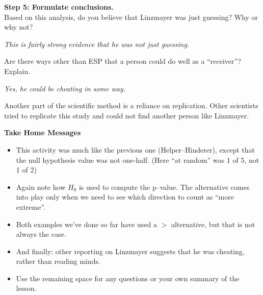 

{\bf Step 5: Formulate conclusions.}\\
 Based on this analysis, do you believe  that Linzmayer was just
 guessing? Why or why not? 

\begin{students}
  \vspace{1.5cm}
\end{students}
\begin{key}
{\it This is fairly strong evidence that he was not just guessing.}
\end{key}

Are there ways other than ESP that a person could do well as a ``receiver''?
Explain. 

\begin{students}
  \vspace{1cm}
\end{students}
\begin{key}
{\it Yes, he could be cheating in some way.}
\end{key}


Another part of the scientific method is a reliance on replication.
Other scientists tried to replicate this study and could not find
another person like Linzmayer. 



{\bf Take Home Messages}\vspace{-.5cm}
\begin{itemize}
\item 
This activity was much like the previous one (Helper--Hinderer),
except that the null hypothesis value was not one-half. (Here ``at
random'' was 1 of 5, not 1 of 2)
\item 
Again note how $H_0$ is used to compute the p--value.  The alternative
comes into play only when we need to see which direction to count as
``more extreme''.
\item 
Both examples we've done so far have used a $>$ alternative, but that
is not always the case.
\item 
And finally: other reporting on Linzmayer suggests that he was
cheating, rather than reading minds.
 \item 
  Use the remaining space for any questions or your own summary of the
  lesson. \vfill
  
\end{itemize}

